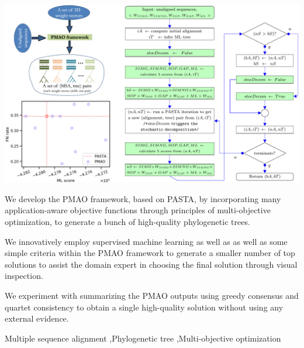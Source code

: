 \documentclass[a4paper,fleqn, review]{cas-dc}
\begin{document}
\begin{graphicalabstract}
	\includegraphics[width=1.0\textwidth]{graphical-abs.pdf}
\end{graphicalabstract}

\begin{highlights}
	\item We develop the PMAO framework, based on PASTA, by incorporating many application-aware objective functions through principles of multi-objective optimization, to generate a bunch of high-quality phylogenetic trees.
	\item We innovatively employ supervised machine learning as well as as well as some simple criteria within the PMAO framework to generate a smaller number of top solutions to assist the domain expert in choosing the final solution through visual inspection.
	\item We experiment with summarizing the PMAO outputs using greedy consensus and quartet consistency to obtain a single high-quality solution without using any external evidence.
\end{highlights}

\begin{keywords}
	Multiple sequence alignment \sep Phylogenetic tree \sep Multi-objective optimization
\end{keywords}



\maketitle
\end{document}
